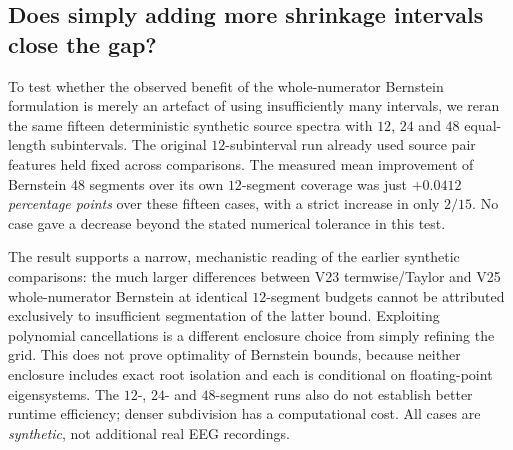 \subsection{Does simply adding more shrinkage intervals close the gap?}
\label{sec:p4-refinement}
To test whether the observed benefit of the
whole-numerator Bernstein formulation is merely
an artefact of using insufficiently many intervals,
we reran the same fifteen deterministic synthetic
source spectra with $12$, $24$ and $48$
equal-length subintervals. The original
$12$-subinterval run already used source
pair features held fixed across comparisons.
The measured mean improvement of Bernstein
$48$ segments over its own $12$-segment
coverage was just \emph{$+0.0412$ percentage
points} over these fifteen cases, with a
strict increase in only $2/15$.
No case gave a decrease beyond the
stated numerical tolerance in this test.

The result supports a narrow, mechanistic
reading of the earlier synthetic comparisons:
the much larger differences between V23
termwise/Taylor and V25 whole-numerator
Bernstein at identical $12$-segment budgets
cannot be attributed exclusively to
insufficient segmentation of the latter
bound. Exploiting polynomial cancellations
is a different enclosure choice from
simply refining the grid. This does not
prove optimality of Bernstein bounds,
because neither enclosure includes exact
root isolation and each is conditional
on floating-point eigensystems.
The $12$-, $24$- and $48$-segment runs also
do not establish better runtime efficiency;
denser subdivision has a computational cost.
All cases are \emph{synthetic}, not
additional real EEG recordings.
